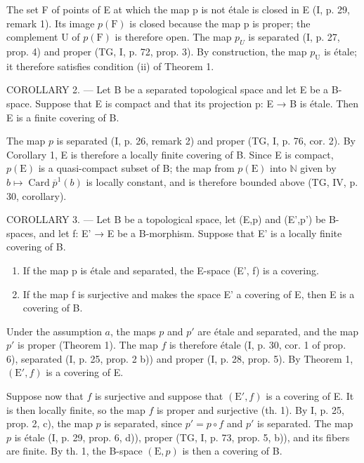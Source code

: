 The set F of points of E at which the map p is not étale is closed in E (I, p. 29, remark 1). Its image \(p(\mathrm{F})\) is closed because the map p is proper; the complement U of \(p(\mathrm{F})\) is therefore open. The map \(p_{U}\) is separated (I, p. 27, prop. 4) and proper (TG, I, p. 72, prop. 3). By construction, the map \(p_{\mathrm{U}}\) is étale; it therefore satisfies condition (ii) of Theorem 1.

COROLLARY 2. — Let B be a separated topological space and let E be a B-space. Suppose that E is compact and that its projection p: E → B is étale. Then E is a finite covering of B.

The map \(p\) is separated (I, p. 26, remark 2) and proper (TG, I, p. 76, cor. 2). By Corollary 1, E is therefore a locally finite covering of B. Since E is compact, \(p(\mathrm{E})\) is a quasi-compact subset of B; the map from \(p(\mathrm{E})\) into \(\mathbb{N}\) given by \(b \mapsto \operatorname{Card} \overline{p}^1(b)\) is locally constant, and is therefore bounded above (TG, IV, p. 30, corollary).

COROLLARY 3. --- Let B be a topological space, let (E,p) and (E',p') be B-spaces, and let f: E' → E be a B-morphism. Suppose that E' is a locally finite covering of B.

\begin{enumerate}
\def\labelenumi{\alph{enumi})}
\item
  If the map p is étale and separated, the E-space (E', f) is a covering.
\item
  If the map f is surjective and makes the space E' a covering of E, then E is a covering of B.
\end{enumerate}

Under the assumption \(a\), the maps \(p\) and \(p'\) are étale and separated, and the map \(p'\) is proper (Theorem 1). The map \(f\) is therefore étale (I, p. 30, cor. 1 of prop. 6), separated (I, p. 25, prop. 2 b)) and proper (I, p. 28, prop. 5). By Theorem 1, \((\mathrm{E}', f)\) is a covering of E.

Suppose now that \(f\) is surjective and suppose that \((\mathrm{E}', f)\) is a covering of E. It is then locally finite, so the map \(f\) is proper and surjective (th. 1). By I, p. 25, prop. 2, c), the map \(p\) is separated, since \(p' = p \circ f\) and \(p'\) is separated. The map \(p\) is étale (I, p. 29, prop. 6, d)), proper (TG, I, p. 73, prop. 5, b)), and its fibers are finite. By th. 1, the B-space \((\mathrm{E}, p)\) is then a covering of B.


